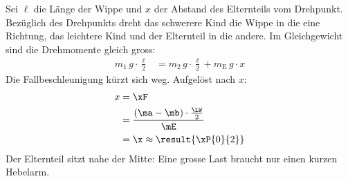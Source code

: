 Sei $\ell$ die Länge der Wippe und $x$ der Abstand des Elternteils vom Drehpunkt. Bezüglich des Drehpunkts dreht das schwerere Kind die Wippe in die eine Richtung, das leichtere Kind und der Elternteil in die andere. Im Gleichgewicht sind die Drehmomente gleich gross:
\begin{align}
 m_1\,g\cdot\frac{\ell}{2} &= m_2\,g\cdot\frac{\ell}{2} + m_\mathrm{E}\,g\cdot x
\end{align}
Die Fallbeschleunigung kürzt sich weg. Aufgelöst nach $x$:
\begin{align}
 x &= \xF \\
   &= \frac{(\ma-\mb)\cdot\frac{\LW}{2}}{\mE} \\
   &= \x \approx \result{\xP{0}{2}}
\end{align}
Der Elternteil sitzt nahe der Mitte: Eine grosse Last braucht nur einen kurzen Hebelarm.
